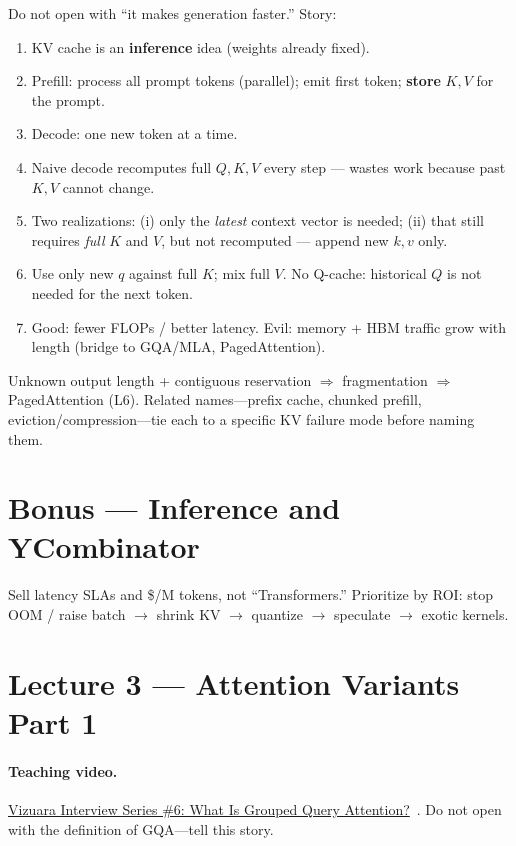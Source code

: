 \documentclass[11pt,a4paper]{article}
\begin{document}
Do not open with ``it makes generation faster.'' Story:
\begin{enumerate}[leftmargin=*]
  \item KV cache is an \textbf{inference} idea (weights already fixed).
  \item Prefill: process all prompt tokens (parallel); emit first token; \textbf{store} $K,V$ for the prompt.
  \item Decode: one new token at a time.
  \item Naive decode recomputes full $Q,K,V$ every step --- wastes work because past $K,V$ cannot change.
  \item Two realizations: (i) only the \emph{latest} context vector is needed; (ii) that still requires \emph{full} $K$ and $V$, but not recomputed --- append new $k,v$ only.
  \item Use only new $q$ against full $K$; mix full $V$. No Q-cache: historical $Q$ is not needed for the next token.
  \item Good: fewer FLOPs / better latency. Evil: memory + HBM traffic grow with length (bridge to GQA/MLA, PagedAttention).
\end{enumerate}

Unknown output length + contiguous reservation $\Rightarrow$ fragmentation $\Rightarrow$ PagedAttention (L6).
Related names---prefix cache, chunked prefill, eviction/compression---tie each to a specific KV failure mode before naming them.

\section{Bonus --- Inference and YCombinator}
Sell latency SLAs and \$/M tokens, not ``Transformers.''
Prioritize by ROI: stop OOM / raise batch $\rightarrow$ shrink KV $\rightarrow$ quantize $\rightarrow$ speculate $\rightarrow$ exotic kernels.

\section{Lecture 3 --- Attention Variants Part 1}
\paragraph{Teaching video.}
\href{https://www.youtube.com/watch?v=mtsY7JsGQjw}{Vizuara Interview Series \#6: What Is Grouped Query Attention?}~\cite{vizuara-gqa-yt}.
Do not open with the definition of GQA---tell this story.
\end{document}
